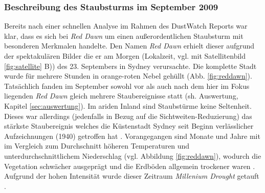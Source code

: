 \documentclass[12pt,a4paper,onecolumn,headheight=30pt]{scrartcl}
\begin{document}
\subsubsection{Beschreibung des Staubsturms im September 2009} \label{sec:reddawn}
Bereits nach einer schnellen Analyse im Rahmen des DustWatch Reports \citep{Leys.2009} war klar, dass es sich bei \textit{Red Dawn} um einen außerordentlichen Staubsturm mit besonderen Merkmalen handelte. Den Namen \textit{Red Dawn} erhielt dieser aufgrund der spektakulären Bilder die er am Morgen (Lokalzeit, vgl. mit Satellitenbild \ref{fig:satellite} B)) des 23. Septembers in Sydney verursachte. Die komplette Stadt wurde für mehrere Stunden in orange-roten Nebel gehüllt (Abb. \ref{fig:reddawn}). Tatsächlich fanden im September sowohl vor als auch nach dem hier im Fokus liegenden \textit{Red Dawn} gleich mehrere Staubereignisse statt (sh. Auswertung, Kapitel \ref{sec:auswertung}). Im ariden Inland sind Staubstürme keine Seltenheit. Dieses war allerdings (jedenfalls in Bezug auf die Sichtweiten-Reduzierung) das stärkste Staubereignis welches die Küstenstadt Sydney seit Beginn verlässlicher Aufzeichnungen (1940) getroffen hat \citep{Leys.2011}. Vorangegangen sind Monate und Jahre mit im Vergleich zum Durchschnitt höheren Temperaturen und unterdurchschnittlichem Niederschlag (vgl. Abbildung \ref{fig:reddawn}), wodurch die Vegetation schwächer ausgeprägt und die Erdböden allgemein trockener waren \citep{Leys.2011}. Aufgrund der hohen Intensität wurde dieser Zeitraum \textit{Millenium Drought} getauft \citep{Deckker.2014}.
\end{document}

